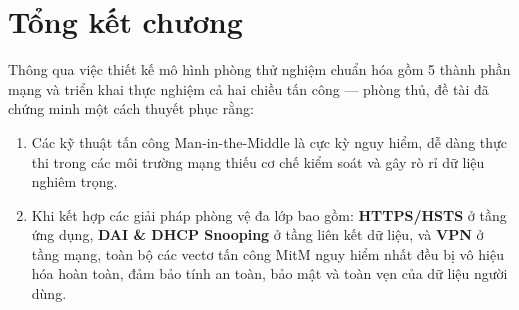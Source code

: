 \section{Tổng kết chương}

Thông qua việc thiết kế mô hình phòng thử nghiệm chuẩn hóa gồm 5 thành phần mạng và triển khai thực nghiệm cả hai chiều tấn công --- phòng thủ, đề tài đã chứng minh một cách thuyết phục rằng:
\begin{enumerate}
  \item Các kỹ thuật tấn công Man-in-the-Middle là cực kỳ nguy hiểm, dễ dàng thực thi trong các môi trường mạng thiếu cơ chế kiểm soát và gây rò rỉ dữ liệu nghiêm trọng.
  \item Khi kết hợp các giải pháp phòng vệ đa lớp bao gồm: \textbf{HTTPS/HSTS} ở tầng ứng dụng, \textbf{DAI \& DHCP Snooping} ở tầng liên kết dữ liệu, và \textbf{VPN} ở tầng mạng, toàn bộ các vectơ tấn công MitM nguy hiểm nhất đều bị vô hiệu hóa hoàn toàn, đảm bảo tính an toàn, bảo mật và toàn vẹn của dữ liệu người dùng.
\end{enumerate}
